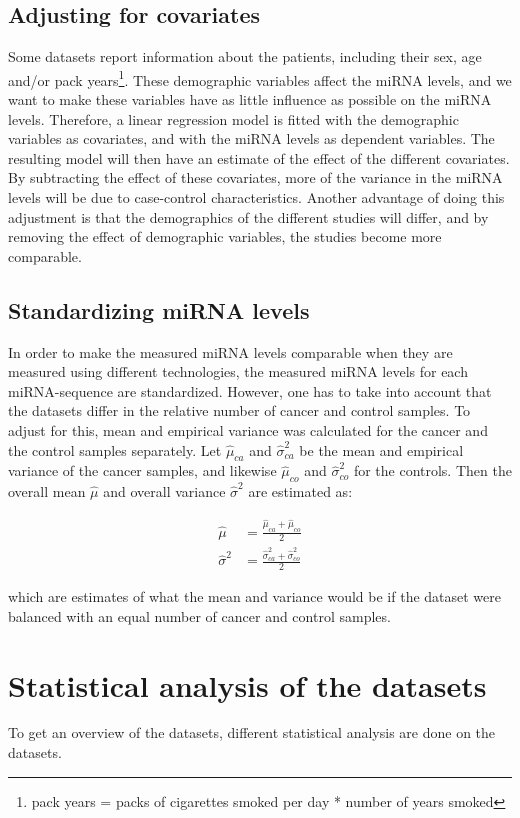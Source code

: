 \subsection{Adjusting for covariates}
Some datasets report information about the patients, including their sex, age and/or pack years\footnote{pack years = packs of cigarettes smoked per day * number of years smoked}. These demographic variables affect the miRNA levels, and we want to make these variables have as little influence as possible on the miRNA levels. Therefore, a linear regression model is fitted with the demographic variables as covariates, and with the miRNA levels as dependent variables. The resulting model will then have an estimate of the effect of the different covariates. By subtracting the effect of these covariates, more of the variance in the miRNA levels will be due to case-control characteristics. Another advantage of doing this adjustment is that the demographics of the different studies will differ, and by removing the effect of demographic variables, the studies become more comparable.


\subsection{Standardizing miRNA levels}
In order to make the measured miRNA levels comparable when they are measured using different technologies, the measured miRNA levels for each miRNA-sequence are standardized. However, one has to take into account that the datasets differ in the relative number of cancer and control samples. To adjust for this, mean and empirical variance was calculated for the cancer and the control samples separately. Let $\hat{\mu}_{ca}$ and $\hat{\sigma}_{ca}^2$ be the mean and empirical variance of the cancer samples, and likewise $\hat{\mu}_{co}$ and $\hat{\sigma}_{co}^2$ for the controls. Then the overall mean $\hat{\mu}$ and overall variance $\hat{\sigma}^2$ are estimated as:

\begin{align*}
	\hat{\mu} & = \frac{\hat{\mu}_{ca} + \hat{\mu}_{co}}{2} \\
	\hat{\sigma}^2 &= \frac{\hat{\sigma}_{ca}^2 + \hat{\sigma}_{co}^2}{2}
\end{align*}

which are estimates of what the mean and variance would be if the dataset were balanced with an equal number of cancer and control samples.

\section{Statistical analysis of the datasets}
To get an overview of the datasets, different statistical analysis are done on the datasets.

